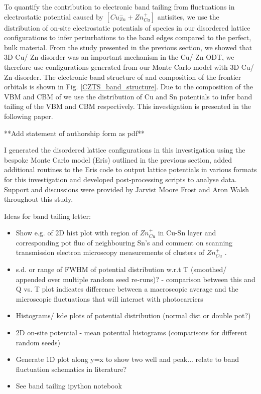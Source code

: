 \documentclass[11pt, twoside]{report}
\begin{document}
To quantify the contribution to electronic band tailing from fluctuations in electrostatic potential caused by $[Cu_{Zn}^{-} + Zn_{Cu}^{+}]$ antisites, we use the distribution of on-site electrostatic potentials of species in our disordered lattice configurations to infer perturbations to the band edges compared to the perfect, bulk material. From the study presented in the previous section, we showed that 3D Cu/ Zn disorder was an important mechanism in the Cu/ Zn ODT, we therefore use configurations generated from our Monte Carlo model with 3D Cu/ Zn disorder. The electronic band structure of {\CZTS} and composition of the frontier orbitals is shown in Fig. \ref{CZTS_band_structure}. Due to the composition of the VBM and CBM of {\CZTS} we use the distribution of Cu and Sn potentials to infer band tailing of the VBM and CBM respectively. This investigation is presented in the following paper.

**Add statement of authorship form as pdf**

I generated the disordered lattice configurations in this investigation using the bespoke Monte Carlo model (Eris) outlined in the previous section, added additional routines to the Eris code to output lattice potentials in various formats for this investigation and developed post-processing scripts to analyse data. Support and discussions were provided by Jarvist Moore Frost and Aron Walsh throughout this study.

Ideas for band tailing letter:
\begin{itemize}
\item Show e.g. of 2D hist plot with region of $Zn_{Cu}^{+}$ in Cu-Sn layer and corresponding pot fluc of neighbouring Sn's and comment on scanning transmission electron microscopy measurements of clusters of $Zn_{Cu}^{+}$ \cite{Zn-on-Cu_clusters}.
\item s.d. or range of FWHM of potential distribution w.r.t T (smoothed/ appended over multiple random seed re-runs)? - comparison between this and Q vs. T plot indicates difference between a macroscopic average and the microscopic fluctuations that will interact with photocarriers
\item Histograms/ kde plots of potential distribution (normal dist or double pot?)
\item 2D on-site potential - mean potential histograms (comparisons for different random seeds)
\item Generate 1D plot along y=x to show two well and peak... relate to band fluctuation schematics in literature?
\item See band tailing ipython notebook
\end{itemize}
\end{document}
